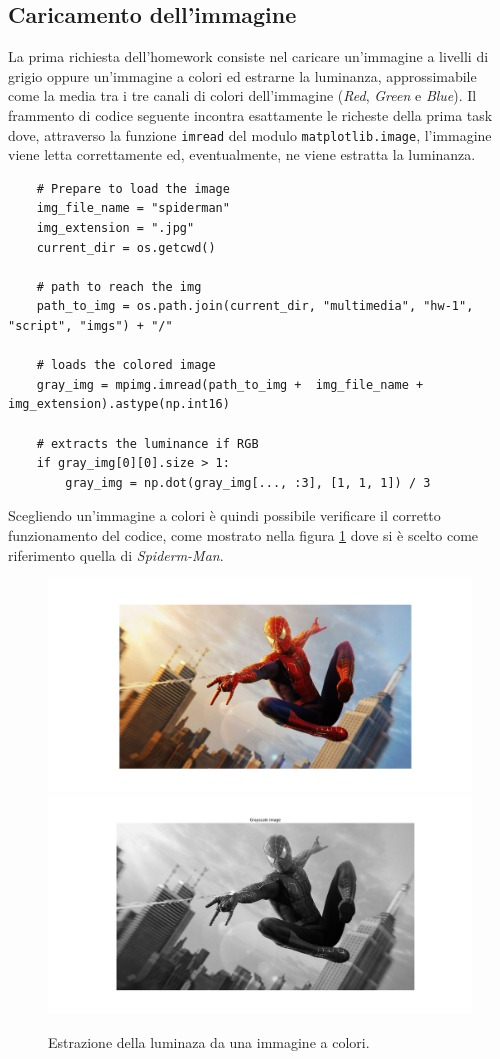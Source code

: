 \vspace{15px}\subsection{Caricamento dell'immagine}
La prima richiesta dell'homework consiste nel caricare un'immagine a livelli di grigio oppure un'immagine a colori ed estrarne la luminanza, approssimabile come la media tra i tre canali di colori dell'immagine (\textsl{Red}, \textsl{Green} e \textsl{Blue}). Il frammento di codice seguente incontra esattamente le richeste della prima task dove, attraverso la funzione \texttt{imread} del modulo \texttt{matplotlib.image}, l'immagine viene letta correttamente ed, eventualmente, ne viene estratta la luminanza.

\begin{lstlisting}
    # Prepare to load the image
    img_file_name = "spiderman"
    img_extension = ".jpg"
    current_dir = os.getcwd()

    # path to reach the img
    path_to_img = os.path.join(current_dir, "multimedia", "hw-1", "script", "imgs") + "/"

    # loads the colored image
    gray_img = mpimg.imread(path_to_img +  img_file_name + img_extension).astype(np.int16)

    # extracts the luminance if RGB
    if gray_img[0][0].size > 1:
        gray_img = np.dot(gray_img[..., :3], [1, 1, 1]) / 3
\end{lstlisting}

\noindent Scegliendo un'immagine a colori è quindi possibile verificare il corretto funzionamento del codice, come mostrato nella figura \ref{fig:colored-grayscale} dove si è scelto come riferimento quella di \textsl{Spiderm-Man}.

\begin{figure}[h]
    \centering
    \includegraphics[width = .7\textwidth]{hw-1/report/imgs/colored.png}
    \includegraphics[width = .7\textwidth]{hw-1/report/imgs/grayscale.png}
    \caption{Estrazione della luminaza da una immagine a colori.}
    \label{fig:colored-grayscale}
\end{figure}



